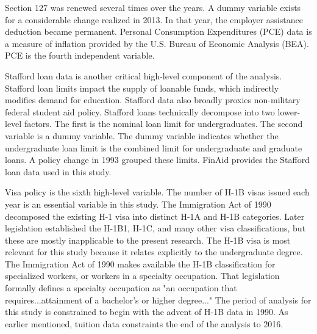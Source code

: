 \documentclass[review]{elsarticle}
\begin{document}
Section 127 was renewed several times over the years.
A dummy variable exists for a considerable change realized in 2013.
In that year, the employer assistance deduction became permanent.
Personal Consumption Expenditures (PCE) data is a measure of inflation provided by the U.S. Bureau of Economic Analysis (BEA)\cite{bea_2020}.
PCE is the fourth independent variable.

Stafford loan data is another critical high-level component of the analysis.
Stafford loan limits impact the supply of loanable funds, which indirectly modifies demand for education.
Stafford data also broadly proxies non-military federal student aid policy.
Stafford loans technically decompose into two lower-level factors.
The first is the nominal loan limit for undergraduates.
The second variable is a dummy variable.
The dummy variable indicates whether the undergraduate loan limit is the combined limit for undergraduate and graduate loans.
A policy change in 1993 grouped these limits.
FinAid provides the Stafford loan data used in this study\cite{finaid_2020}.

Visa policy is the sixth high-level variable.
The number of H-1B visas issued each year is an essential variable in this study.
The Immigration Act of 1990 decomposed the existing H-1 visa into distinct H-1A and H-1B categories.
Later legislation established the H-1B1, H-1C, and many other visa classifications, but these are mostly inapplicable to the present research.
The H-1B visa is most relevant for this study because it relates explicitly to the undergraduate degree.
The Immigration Act of 1990 makes available the H-1B classification for specialized workers, or workers in a specialty occupation.
That legislation formally defines a specialty occupation as "an occupation that requires...attainment of a bachelor's or higher degree..."
The period of analysis for this study is constrained to begin with the advent of H-1B data in 1990.
As earlier mentioned, tuition data constraints the end of the analysis to 2016.
\end{document}
